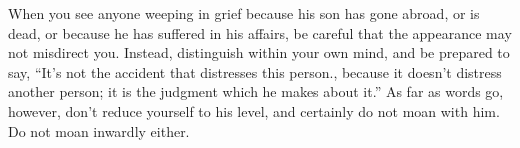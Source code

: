 When you see anyone weeping in grief because his son has gone
abroad, or is dead, or because he has suffered in his affairs, be
careful that the appearance may not misdirect you. Instead, distinguish
within your own mind, and be prepared to say, ``It's not the accident
that distresses this person., because it doesn't distress another
person; it is the judgment which he makes about it.'' As far as words
go, however, don't reduce yourself to his level, and certainly do
not moan with him. Do not moan inwardly either. 
